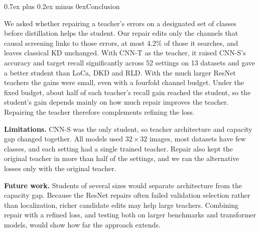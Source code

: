 \documentclass[10pt,journal,compsoc]{IEEEtran}
\makeatletter
\def\section{\@startsection{section}{1}{\z@}{-3.5ex plus -0.5ex minus -1.5ex}%
{0.7ex plus 0.2ex minus 0ex}{\normalfont\sublargesize\sffamily\bfseries\scshape}}
\theoremstyle{definition}
\makeatother
\begin{document}
\FloatBarrier
\vspace{-5pt}
\section{Conclusion}
\label{sec:conclusion}

We asked whether repairing a teacher's errors on a designated set of
classes before distillation helps the student. Our repair edits only
the channels that causal screening links to those errors, at most
4.2\% of those it searches, and leaves classical KD unchanged. With
CNN-T as the teacher, it raised CNN-S's accuracy and target recall
significantly across 52 settings on 13 datasets and gave a better
student than LoCa, DKD and RLD. With the much larger ResNet teachers
the gains were small, even with a fourfold channel budget. Under the
fixed budget, about half of each teacher's recall gain reached the
student, so the student's gain depends mainly on how much repair
improves the teacher. Repairing the teacher therefore complements
refining the loss.

\textbf{Limitations.} CNN-S was the only student, so teacher
architecture and capacity gap changed together. All models used
$32\times32$ images, most datasets have few classes, and each setting
had a single trained teacher. Repair also kept the original teacher in
more than half of the settings, and we ran the alternative losses only
with the original teacher.

\textbf{Future work.} Students of several sizes would separate
architecture from the capacity gap. Because the ResNet repairs often
failed validation selection rather than localization, richer candidate
edits may help large teachers. Combining repair with a refined loss,
and testing both on larger benchmarks and transformer models, would
show how far the approach extends.

\FloatBarrier




\end{document}
